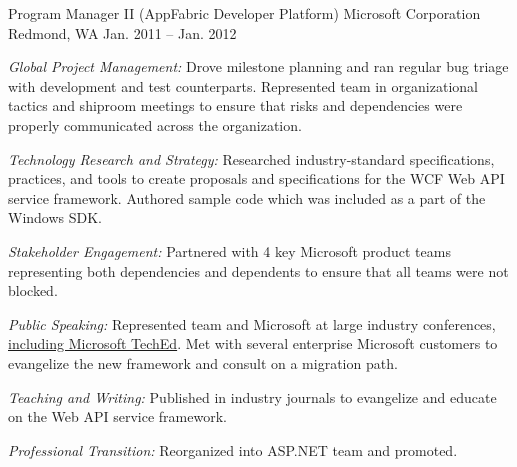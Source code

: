 \begin{cventries}

\cventry 
{Program Manager II (AppFabric Developer Platform)}
{Microsoft Corporation}
{Redmond, WA}
{Jan. 2011 – Jan. 2012}
{ %
\begin{cvitems}
\item {\emph{Global Project Management:} Drove milestone planning and ran regular bug triage with development and test counterparts. Represented team in organizational tactics and shiproom meetings to ensure that risks and dependencies were properly communicated across the organization.}
\item {\emph{Technology Research and Strategy:} Researched industry-standard specifications, practices, and tools to create proposals and specifications for the WCF Web API service framework. Authored sample code which was included as a part of the Windows SDK.}
\item {\emph{Stakeholder Engagement:} Partnered with 4 key Microsoft product teams representing both dependencies and dependents to ensure that all teams were not blocked.}
\item {\emph{Public Speaking:} Represented team and Microsoft at large industry conferences, \href{https://channel9.msdn.com/Events/TechEd/NorthAmerica/2011/MID307}{including Microsoft TechEd}. Met with several enterprise Microsoft customers to evangelize the new framework and consult on a migration path.}
\item {\emph{Teaching and Writing:} Published in industry journals to evangelize and educate on the Web API service framework.}
\item {\emph{Professional Transition:} Reorganized into ASP.NET team and promoted.}
\end{cvitems}
}



\end{cventries}
